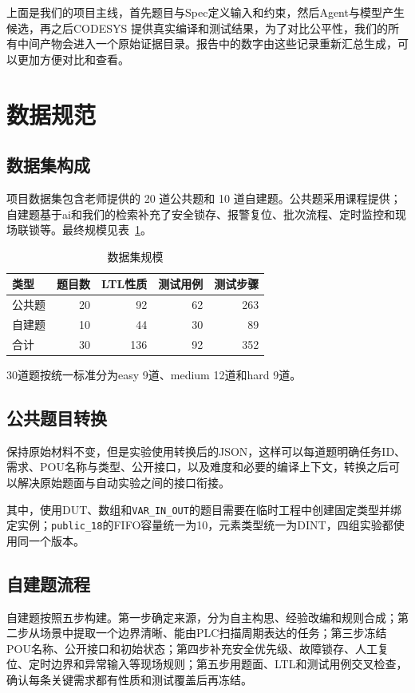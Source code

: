 \documentclass[UTF8,a4paper,zihao=-4]{ctexart}
\begin{document}
上面是我们的项目主线，首先题目与Spec定义输入和约束，然后Agent与模型产生候选，再之后CODESYS 提供真实编译和测试结果，为了对比公平性，我们的所有中间产物会进入一个原始证据目录。报告中的数字由这些记录重新汇总生成，可以更加方便对比和查看。

\section{数据规范}

\subsection{数据集构成}
项目数据集包含老师提供的 20 道公共题和 10 道自建题。公共题采用课程提供；自建题基于ai和我们的检索补充了安全锁存、报警复位、批次流程、定时监控和现场联锁等。最终规模见表~\ref{tab:dataset}。

\begin{table}[H]
  \centering
  \caption{数据集规模}
  \label{tab:dataset}
  \begin{tabular}{lrrrr}
    \toprule
    类型 & 题目数 & LTL性质 & 测试用例 & 测试步骤\\
    \midrule
    公共题 & 20 & 92 & 62 & 263\\
    自建题 & 10 & 44 & 30 & 89\\
    \midrule
    合计 & 30 & 136 & 92 & 352\\
    \bottomrule
  \end{tabular}
\end{table}

30道题按统一标准分为easy 9道、medium 12道和hard 9道。


\subsection{公共题目转换}
保持原始材料不变，但是实验使用转换后的JSON，这样可以每道题明确任务ID、需求、POU名称与类型、公开接口，以及难度和必要的编译上下文，转换之后可以解决原始题面与自动实验之间的接口衔接。

其中，使用DUT、数组和\texttt{VAR\_IN\_OUT}的题目需要在临时工程中创建固定类型并绑定实例；\texttt{public\_18}的FIFO容量统一为10，元素类型统一为DINT，四组实验都使用同一个版本。

\subsection{自建题流程}

自建题按照五步构建。第一步确定来源，分为自主构思、经验改编和规则合成；第二步从场景中提取一个边界清晰、能由PLC扫描周期表达的任务；第三步冻结POU名称、公开接口和初始状态；第四步补充安全优先级、故障锁存、人工复位、定时边界和异常输入等现场规则；第五步用题面、LTL和测试用例交叉检查，确认每条关键需求都有性质和测试覆盖后再冻结。
\end{document}
